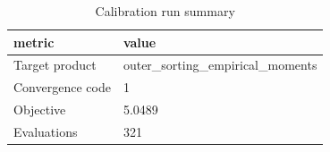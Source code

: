 \begin{table}

\caption{Calibration run summary}
\centering
\begin{tabular}[t]{ll}
\toprule
metric & value\\
\midrule
Target product & outer\_sorting\_empirical\_moments\\
Convergence code & 1\\
Objective & 5.0489\\
Evaluations & 321\\
\bottomrule
\end{tabular}
\end{table}

